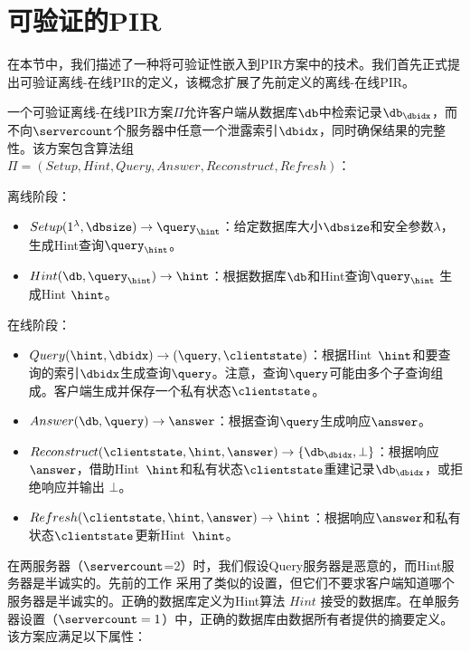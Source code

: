 \section{可验证的PIR}
\label{sec:verification}
在本节中，我们描述了一种将可验证性嵌入到PIR方案中的技术。我们首先正式提出可验证离线-在线PIR的定义，该概念扩展了先前定义的离线-在线PIR。

\begin{definition}
    一个可验证离线-在线PIR方案$\Pi$允许客户端从数据库$\db$中检索记录$\db_\dbidx$，而不向$\servercount$个服务器中任意一个泄露索引$\dbidx$，同时确保结果的完整性。该方案包含算法组$\Pi = (Setup, Hint, Query, Answer, Reconstruct, Refresh)$：
    \begin{center}
        离线阶段：
        \begin{itemize}[leftmargin=*]
            \item $Setup(1^\lambda,\dbsize) \rightarrow \query_\hint$：给定数据库大小$\dbsize$和安全参数$\lambda$，生成Hint查询$\query_\hint$。
            \item $Hint(\db, \query_\hint) \rightarrow \hint$：根据数据库$\db$和Hint查询$\query_\hint$ 生成Hint $\hint$。
        \end{itemize}
        在线阶段：
        \begin{itemize}
            \item $Query(\hint, \dbidx) \rightarrow (\query, \clientstate)$：根据Hint~$\hint$和要查询的索引$\dbidx$生成查询$\query$。注意，查询$\query$可能由多个子查询组成。客户端生成并保存一个私有状态$\clientstate$。
            \item $Answer(\db, \query) \rightarrow \answer$：根据查询$\query$生成响应$\answer$。
            \item $Reconstruct(\clientstate, \hint, \answer) \rightarrow \{\db_\dbidx, \bot\}$：根据响应$\answer$，借助Hint~$\hint$和私有状态$\clientstate$重建记录$\db_\dbidx$，或拒绝响应并输出 $\bot$。
            \item $Refresh(\clientstate, \hint, \answer) \rightarrow \hint$：根据响应$\answer$和私有状态$\clientstate$更新Hint~$\hint$。
        \end{itemize}
    \end{center}
    在两服务器（$\servercount$=2）时，我们假设Query服务器是恶意的，而Hint服务器是半诚实的。先前的工作 \cite{APIR} 采用了类似的设置，但它们不要求客户端知道哪个服务器是半诚实的。正确的数据库定义为Hint算法 $Hint$ 接受的数据库。在单服务器设置（$\servercount=1$）中，正确的数据库由数据所有者提供的摘要定义。该方案应满足以下属性：


\end{definition}
